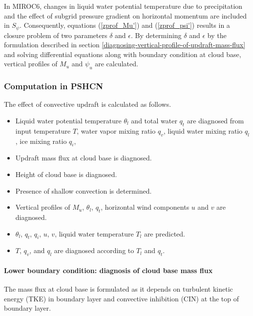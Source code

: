 In MIROC6, changes in liquid water potential temperature due to precipitation and the effect of subgrid pressure gradient on horizontal momentum are included in $S_{\psi}$.
Consequently, equations (\ref{zprof_Mu'}) and (\ref{zprof_psi'}) results in a closure problem of two parameters $\delta$ and $\epsilon$.
By determining $\delta$ and $\epsilon$ by the formulation described in section \ref{diagnosing-vertical-profile-of-updraft-mass-flux}
and solving differential equations along with boundary condition at cloud base, vertical profiles of $M_u$ and $\psi_u$ are calculated.

\subsubsection{Computation in PSHCN}\label{computation-in-PSHCN}

The effect of convective updraft is calculated as follows.
\begin{itemize}
    \item Liquid water potential temperature $\theta_l$ and total water $q_t$ are diagnosed from input temperature $T$, water vapor mixing ratio $q_v$, liquid water mixing ratio $q_l$, ice mixing ratio $q_i$,
    \item Updraft mass flux at cloud base is diagnosed.
    \item Height of cloud base is diagnosed.
    \item Presence of shallow convection is determined.
    \item Vertical profiles of $M_u$, $\theta_l$, $q_t$, horizontal wind components $u$ and $v$ are diagnosed.
    \item $\theta_l$, $q_t$, $q_i$, $u$, $v$, liquid water temperature $T_l$ are predicted.
    \item $T$, $q_v$, and $q_l$ are diagnosed according to $T_l$ and $q_t$.
\end{itemize}

\paragraph{Lower boundary condition: diagnosis of cloud base mass flux}\label{lower-boundary-condition}

The mass flux at cloud base is formulated as it depends on turbulent kinetic energy (TKE) in boundary layer and convective inhibition (CIN) at the top of boundary layer.

